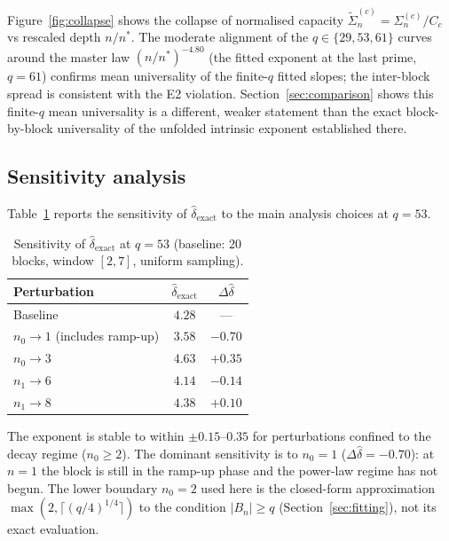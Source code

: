     Figure~\ref{fig:collapse} shows the collapse of normalised capacity
    $\tilde{\Sigma}_n^{(c)} = \Sigma_n^{(c)}/C_c$ vs rescaled depth $n/n^*$.
    The moderate alignment of the $q\in\{29,53,61\}$ curves around the master
    law $(n/n^*)^{-4.80}$ (the fitted exponent at the last prime, $q=61$) confirms mean
    universality of the finite-$q$ fitted slopes; the inter-block spread is consistent with
    the E2 violation. Section~\ref{sec:comparison} shows this finite-$q$ mean universality
    is a different, weaker statement than the exact block-by-block universality of the
    unfolded intrinsic exponent established there.

  \subsection{Sensitivity analysis}
    \label{sec:sensitivity}

    Table~\ref{tab:sensitivity} reports the sensitivity of $\hat{\delta}_{\mathrm{exact}}$
    to the main analysis choices at $q=53$.

    \begin{table}[ht]
      \centering
      \caption{Sensitivity of $\hat{\delta}_{\mathrm{exact}}$ at $q=53$
        (baseline: 20 blocks, window $[2,7]$, uniform sampling).}
      \label{tab:sensitivity}
      \begin{tabular}{lcc}
        \hline
        Perturbation                  & $\hat{\delta}_{\mathrm{exact}}$ & $\Delta\hat{\delta}$ \\
        \hline
        Baseline                      & $4.28$                          & ---                  \\
        $n_0\to 1$ (includes ramp-up) & $3.58$                          & $-0.70$              \\
        $n_0\to 3$                    & $4.63$                          & $+0.35$              \\
        $n_1\to 6$                    & $4.14$                          & $-0.14$              \\
        $n_1\to 8$                    & $4.38$                          & $+0.10$              \\
        \hline
      \end{tabular}
    \end{table}

    The exponent is stable to within $\pm 0.15$--$0.35$ for perturbations confined
    to the decay regime ($n_0 \geq 2$).
    The dominant sensitivity is to $n_0=1$ ($\Delta\hat\delta = -0.70$): at $n=1$
    the block is still in the ramp-up phase and the power-law regime has not begun.
    The lower boundary $n_0=2$ used here is the closed-form approximation
    $\max(2,\lceil(q/4)^{1/4}\rceil)$ to the condition $|B_n|\geq q$
    (Section~\ref{sec:fitting}), not its exact evaluation.
